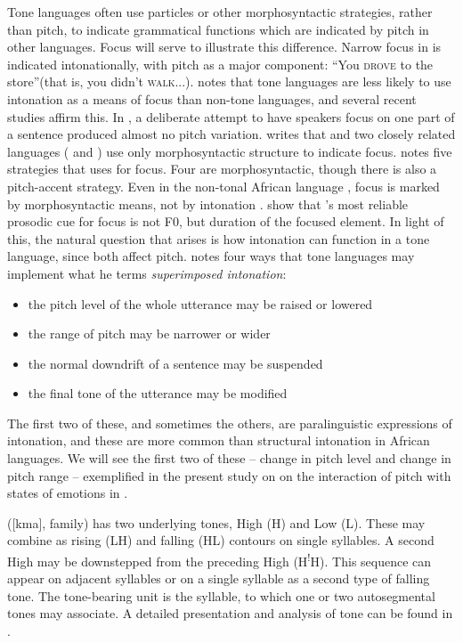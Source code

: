 \documentclass[output=paper]{langsci/langscibook}
\begin{document}
Tone languages often use particles or other morphosyntactic strategies, rather than pitch, to indicate grammatical functions which are indicated by pitch in other languages. Focus will serve to illustrate this difference. Narrow focus in  is indicated intonationally, with pitch as a major component:  ``You \textsc{drove} to the store''(that is, you didn't  \textsc{walk}...). \citet[73]{cruttenden1997} notes that tone languages are less likely to use intonation as a means of focus than non-tone languages, and several recent studies affirm this. In  \citep{Lomotey2014}, a deliberate attempt to have speakers focus on one part of a sentence produced almost no pitch variation. \citet{Schwarz2009copula} writes that  and two closely related languages ( and ) use only morphosyntactic structure to indicate focus. \citet{harley2009} notes five strategies that  uses for focus. Four are morphosyntactic, though there is also a pitch-accent strategy. Even in the non-tonal African language , focus is marked by morphosyntactic means, not by intonation \citep{riallandrobert2001}. \citet{fiedlerjannedy2013} show that 's most reliable prosodic cue for focus is not F0, but duration of the focused element.
% 
In light of this, the natural question that arises is how intonation can function in a tone language, since both affect pitch. \citet[9--10]{cruttenden1997} notes four ways that tone languages may implement what he terms \emph{superimposed intonation}:

\begin{itemize}
\item the pitch level of the whole utterance may be raised or lowered
\item the range of pitch may be narrower or wider
\item the normal downdrift of a sentence may be suspended
\item the final tone of the utterance may be modified
\end{itemize}

The first two of these, and sometimes the others, are paralinguistic expressions of intonation, and these are more common than structural intonation in African languages. We will see the first two of these -- change in pitch level and change in pitch range -- exemplified in the present study on  on the interaction of pitch with states of emotions in .

 ([kma],  family) has two underlying tones, High (H) and Low (L). These may combine as rising (LH) and falling (HL) contours on single syllables. A second High may be downstepped from the preceding High (H\textsuperscript{!}H). This sequence can appear on adjacent syllables or on a single syllable as a second type of falling tone. The tone-bearing unit is the syllable, to which one or two autosegmental tones may associate. A detailed presentation and analysis of  tone can be found in \citet{Cahill2007aspects}. 
\end{document}
